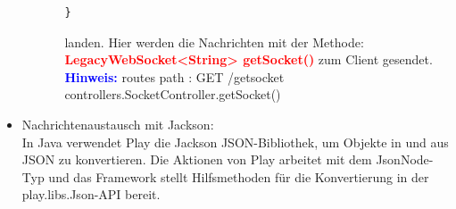 \begin{itemize}
\begin{enumerate}
\begin{enumerate}
\begin{lstlisting}[frame=single]
}
\end{lstlisting}

 landen.
 Hier werden die Nachrichten mit der Methode:\\ \textcolor{red}{\textbf{LegacyWebSocket<String> getSocket()}} zum Client gesendet.\\
\textcolor{blue}{\textbf{Hinweis:}} routes path : GET  /getsocket  controllers.SocketController.getSocket()
\end{enumerate}
\end{enumerate}
\item Nachrichtenaustausch mit Jackson:\\
In Java verwendet Play die Jackson JSON-Bibliothek, um Objekte in und aus JSON zu konvertieren. Die Aktionen von Play arbeitet mit dem JsonNode-Typ und das Framework stellt Hilfsmethoden für die Konvertierung in der play.libs.Json-API bereit. 
\end{itemize}

